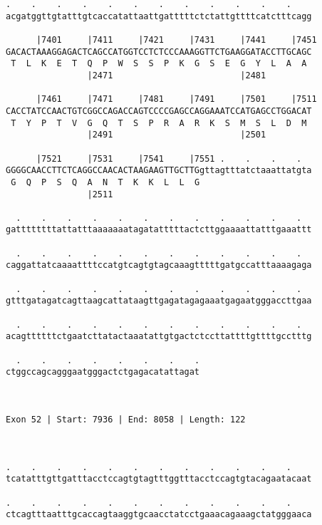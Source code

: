 \documentclass{article}
\begin{document}
\begin{Verbatim}
.    .    .    .    .    .    .    .    .    .    .    .    
acgatggttgtatttgtcaccatattaattgatttttctctattgttttcatctttcagg
                                                            
      |7401     |7411     |7421     |7431     |7441     |7451
GACACTAAAGGAGACTCAGCCATGGTCCTCTCCCAAAGGTTCTGAAGGATACCTTGCAGC
 T  L  K  E  T  Q  P  W  S  S  P  K  G  S  E  G  Y  L  A  A 
                |2471                         |2481         
  
      |7461     |7471     |7481     |7491     |7501     |7511
CACCTATCCAACTGTCGGCCAGACCAGTCCCCGAGCCAGGAAATCCATGAGCCTGGACAT
 T  Y  P  T  V  G  Q  T  S  P  R  A  R  K  S  M  S  L  D  M 
                |2491                         |2501         
  
      |7521     |7531     |7541     |7551 .    .    .    .  
GGGGCAACCTTCTCAGGCCAACACTAAGAAGTTGCTTGgttagtttatctaaattatgta
 G  Q  P  S  Q  A  N  T  K  K  L  L  G                      
                |2511                                       
  
  .    .    .    .    .    .    .    .    .    .    .    .  
gattttttttattatttaaaaaaatagatatttttactcttggaaaattatttgaaattt
                                                            
  .    .    .    .    .    .    .    .    .    .    .    .  
caggattatcaaaattttccatgtcagtgtagcaaagtttttgatgccatttaaaagaga
                                                            
  .    .    .    .    .    .    .    .    .    .    .    .  
gtttgatagatcagttaagcattataagttgagatagagaaatgagaatgggaccttgaa
                                                            
  .    .    .    .    .    .    .    .    .    .    .    .  
acagttttttctgaatcttatactaaatattgtgactctccttattttgttttgcctttg
                                                            
  .    .    .    .    .    .    .    .
ctggccagcagggaatgggactctgagacatattagat
                                      
                                      
 
Exon 52 | Start: 7936 | End: 8058 | Length: 122



.    .    .    .    .    .    .    .    .    .    .    .    
tcatatttgttgatttacctccagtgtagtttggtttacctccagtgtacagaatacaat
                                                            
.    .    .    .    .    .    .    .    .    .    .    .    
ctcagtttaatttgcaccagtaaggtgcaacctatcctgaaacagaaagctatgggaaca
                                                            

\end{Verbatim}
\end{document}

